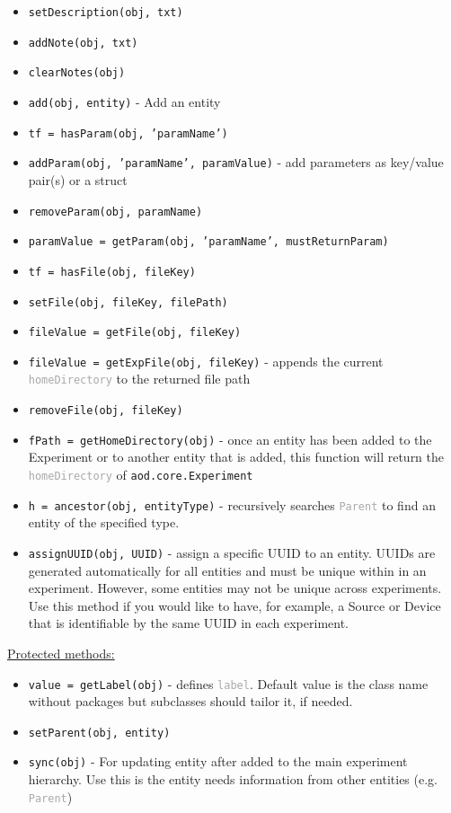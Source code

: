 \documentclass[10pt]{exam}
\newcommand\aodclass[1]{\textcolor{codeblue}{\texttt{#1}}}
\newcommand\aodprop[1]{\textcolor{darkgray}{\texttt{#1}}}
\newcommand\aodfcn[1]{\textcolor{darkteal}{\texttt{#1}}}
\newcommand\docheader[1]{\vspace{0.6ex}\noindent\underline{#1}\vspace{0.15ex}}
\begin{document}
		\begin{itemize}
			\item \aodfcn{setDescription(obj, txt)}
			\item \aodfcn{addNote(obj, txt)}
			\item \aodfcn{clearNotes(obj)}\\
			\item \aodfcn{add(obj, entity)} - Add an entity\\
			\item \aodfcn{tf = hasParam(obj, 'paramName')}
			\item \aodfcn{addParam(obj, 'paramName', paramValue)} - add parameters as key/value pair(s) or a struct
			\item \aodfcn{removeParam(obj, paramName)}
			\item \aodfcn{paramValue = getParam(obj, 'paramName', mustReturnParam)}\\
			\item \aodfcn{tf = hasFile(obj, fileKey)}
			\item \aodfcn{setFile(obj, fileKey, filePath)}
			\item \aodfcn{fileValue = getFile(obj, fileKey)}
			\item \aodfcn{fileValue = getExpFile(obj, fileKey)} - appends the current \aodprop{homeDirectory} to the returned file path
			\item \aodfcn{removeFile(obj, fileKey)}\\
			\item \aodfcn{fPath = getHomeDirectory(obj)} - once an entity has been added to the Experiment or to another entity that is added, this function will return the \aodprop{homeDirectory} of \aodclass{aod.core.Experiment}
			\item \aodfcn{h = ancestor(obj, entityType)} - recursively searches \aodprop{Parent} to find an entity of the specified type. %
			\item \aodfcn{assignUUID(obj, UUID)} - assign a specific UUID to an entity. UUIDs are generated automatically for all entities and must be unique within in an experiment. However, some entities may not be unique across experiments. Use this method if you would like to have, for example, a Source or Device that is identifiable by the same UUID in each experiment. 
		\end{itemize}
		\docheader{Protected methods:}
		\begin{itemize}
			\item \aodfcn{value = getLabel(obj)} - defines \aodprop{label}. Default value is the class name without packages but subclasses should tailor it, if needed.
			\item \aodfcn{setParent(obj, entity)}
			\item \aodfcn{sync(obj)} - For updating entity after added to the main experiment hierarchy. Use this is the entity needs information from other entities (e.g. \aodprop{Parent})
		\end{itemize}
			
\end{document}
